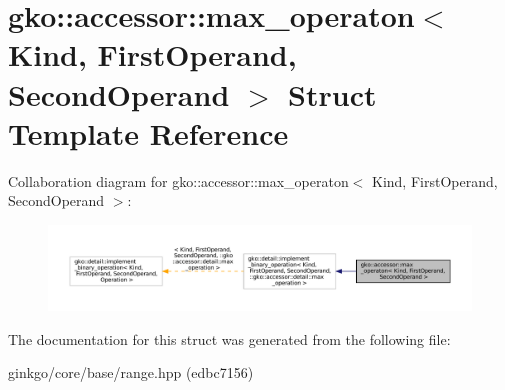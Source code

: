 \hypertarget{structgko_1_1accessor_1_1max__operaton}{}\section{gko\+:\+:accessor\+:\+:max\+\_\+operaton$<$ Kind, First\+Operand, Second\+Operand $>$ Struct Template Reference}
\label{structgko_1_1accessor_1_1max__operaton}


Collaboration diagram for gko\+:\+:accessor\+:\+:max\+\_\+operaton$<$ Kind, First\+Operand, Second\+Operand $>$\+:
\nopagebreak
\begin{figure}[H]
\begin{center}
\leavevmode
\includegraphics[width=350pt]{structgko_1_1accessor_1_1max__operaton__coll__graph}
\end{center}
\end{figure}


The documentation for this struct was generated from the following file\+:\begin{DoxyCompactItemize}
\item 
ginkgo/core/base/range.\+hpp (edbc7156)\end{DoxyCompactItemize}

